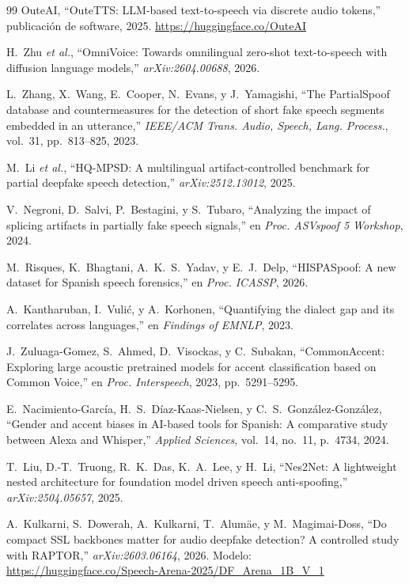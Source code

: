 \documentclass[11pt]{article}
\begin{document}
\begin{thebibliography}{99}
OuteAI,
``OuteTTS: LLM-based text-to-speech via discrete audio tokens,''
publicaci\'on de software, 2025. \url{https://huggingface.co/OuteAI}

H.~Zhu \emph{et al.},
``OmniVoice: Towards omnilingual zero-shot text-to-speech with diffusion
language models,'' \emph{arXiv:2604.00688}, 2026.

L.~Zhang, X.~Wang, E.~Cooper, N.~Evans, y J.~Yamagishi,
``The PartialSpoof database and countermeasures for the detection of
short fake speech segments embedded in an utterance,''
\emph{IEEE/ACM Trans. Audio, Speech, Lang. Process.}, vol.~31,
pp.~813--825, 2023.

M.~Li \emph{et al.},
``HQ-MPSD: A multilingual artifact-controlled benchmark for partial
deepfake speech detection,'' \emph{arXiv:2512.13012}, 2025.

V.~Negroni, D.~Salvi, P.~Bestagini, y S.~Tubaro,
``Analyzing the impact of splicing artifacts in partially fake speech
signals,'' en \emph{Proc. ASVspoof 5 Workshop}, 2024.

M.~Risques, K.~Bhagtani, A.~K.~S.~Yadav, y E.~J.~Delp,
``HISPASpoof: A new dataset for Spanish speech forensics,''
en \emph{Proc. ICASSP}, 2026.

A.~Kantharuban, I.~Vuli\'c, y A.~Korhonen,
``Quantifying the dialect gap and its correlates across languages,''
en \emph{Findings of EMNLP}, 2023.

J.~Zuluaga-Gomez, S.~Ahmed, D.~Visockas, y C.~Subakan,
``CommonAccent: Exploring large acoustic pretrained models for accent
classification based on Common Voice,''
en \emph{Proc. Interspeech}, 2023, pp.~5291--5295.

E.~Nacimiento-Garc\'ia, H.~S.~D\'iaz-Kaas-Nielsen, y
C.~S.~Gonz\'alez-Gonz\'alez,
``Gender and accent biases in AI-based tools for Spanish: A comparative
study between Alexa and Whisper,''
\emph{Applied Sciences}, vol.~14, no.~11, p.~4734, 2024.

T.~Liu, D.-T.~Truong, R.~K.~Das, K.~A.~Lee, y H.~Li,
``Nes2Net: A lightweight nested architecture for foundation model driven
speech anti-spoofing,'' \emph{arXiv:2504.05657}, 2025.

A.~Kulkarni, S.~Dowerah, A.~Kulkarni, T.~Alum\"ae, y M.~Magimai-Doss,
``Do compact SSL backbones matter for audio deepfake detection? A
controlled study with RAPTOR,'' \emph{arXiv:2603.06164}, 2026.
Modelo: \url{https://huggingface.co/Speech-Arena-2025/DF_Arena_1B_V_1}


\end{thebibliography}
\end{document}
